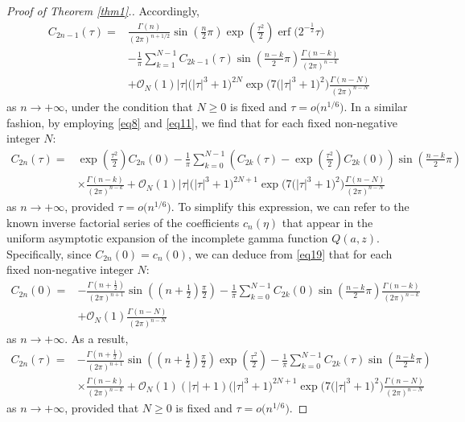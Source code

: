 \documentclass[pdftex]{sigma}
\def\erf{\operatorname{erf}}
\numberwithin{equation}{section}
\begin{document}
\begin{proof}[Proof of Theorem \ref{thm1}.]
Accordingly,
\begin{align}
C_{2n - 1} (\tau ) ={}& \frac{\Gamma (n)}{(2\pi )^{n + 1/2} }\sin \left( \frac{n}{2}\pi \right)\exp \left( \frac{\tau ^2}{2} \right)\erf\big( 2^{ - \frac{1}{2}} \tau \big)\nonumber\\
& - \frac{1}{\pi}\sum_{k = 1}^{N - 1} C_{2k - 1} (\tau )\sin \left( \frac{n - k}{2}\pi \right)\frac{\Gamma (n - k)}{(2\pi )^{n - k} }\nonumber
\\ & +\mathcal{O}_N (1)\left| \tau \right|\bigl(\left| \tau \right|^3 + 1\bigr)^{2N} \exp \big( 7\bigl(\left| \tau \right|^3 + 1\bigr)^2 \big) \frac{\Gamma (n - N)}{(2\pi )^{n - N}}\label{eq12}
\end{align}
as $n\to+\infty$, under the condition that $N\ge 0$ is fixed and $\tau = o\big(n^{1/6}\big)$. In a similar fashion, by employing \eqref{eq8} and \eqref{eq11}, we find that for each fixed non-negative integer $N$:
\begin{align*}
C_{2n} (\tau ) ={}& \exp \left( \frac{\tau ^2}{2} \right)C_{2n} (0) - \frac{1}{\pi}\sum_{k = 0}^{N - 1} \left( C_{2k} (\tau ) - \exp \left( \frac{\tau ^2}{2} \right)C_{2k} (0) \right)\sin \left( \frac{n - k}{2}\pi \right)
\\ &\times\frac{\Gamma (n - k)}{(2\pi )^{n - k}} + \mathcal{O}_N (1)\left| \tau \right|\bigl(\left| \tau \right|^3 + 1\bigr)^{2N + 1} \exp \big( 7\bigl(\left| \tau \right|^3 + 1\bigr)^2 \big)\frac{\Gamma (n - N)}{(2\pi )^{n - N}}
\end{align*}
as $n\to+\infty$, provided $\tau = o\big(n^{1/6}\big)$. To simplify this expression, we can refer to the known inverse factorial series of the coefficients $c_n(\eta)$ that appear in the uniform asymptotic expansion of the incomplete gamma function $Q(a,z)$. Specifically, since $C_{2n}(0)=c_n(0)$, we can deduce from \eqref{eq19} that for each fixed non-negative integer $N$:
\begin{align*}
C_{2n} (0) ={}& - \frac{\Gamma \left( n + \frac{1}{2} \right)}{(2\pi )^{n + 1}}\sin \left( \left(n + \frac{1}{2}\right)\frac{\pi}{2} \right) - \frac{1}{\pi }\sum_{k = 0}^{N - 1} C_{2k} (0)\sin \left( \frac{n - k}{2}\pi \right)\frac{\Gamma (n - k)}{(2\pi )^{n - k}} \\ & + \mathcal{O}_N(1)\frac{\Gamma (n - N)}{(2\pi )^{n - N} }
\end{align*}
as $n\to+\infty$. As a result,
\begin{align}
C_{2n} (\tau ) ={}& -\frac{\Gamma \left( n + \frac{1}{2} \right)}{(2\pi )^{n + 1} }\sin \left( \left( n + \frac{1}{2} \right)\frac{\pi }{2} \right)\exp \left( \frac{\tau ^2}{2} \right) - \frac{1}{\pi }\sum\limits_{k = 0}^{N-1} C_{2k} (\tau )\sin \left( \frac{n - k}{2}\pi \right)\nonumber
\\ &\times\frac{\Gamma (n - k)}{(2\pi )^{n - k} } + \mathcal{O}_N (1)(\left| \tau \right|+1)\bigl(\left| \tau \right|^3 + 1\bigr)^{2N + 1} \exp \big( 7\bigl(\left| \tau \right|^3 + 1\bigr)^2 \big)\frac{\Gamma (n - N)}{(2\pi )^{n - N}}\label{eq13}
\end{align}
as $n\to+\infty$, provided that $N\ge 0$ is fixed and $\tau = o\big(n^{1/6}\big)$.


\end{proof}
\end{document}
